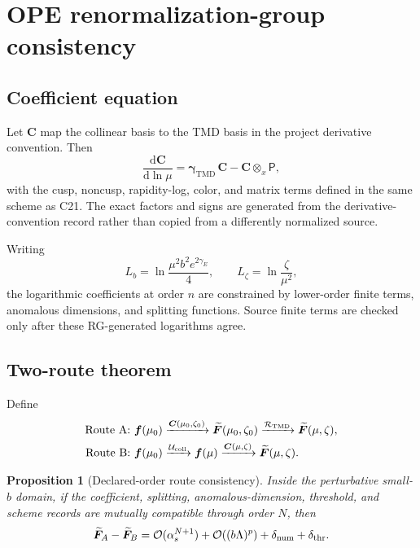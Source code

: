 \documentclass[11pt]{article}
\newtheorem{proposition}[definition]{Proposition}
\newcommand{\dd}{\mathrm{d}}
\newcommand{\TMD}{\mathrm{TMD}}
\newcommand{\cR}{\mathcal R}
\newcommand{\cU}{\mathcal U}
\newcommand{\otimesx}{\mathbin{\otimes_x}}
\newcommand{\order}{\mathcal O}
\newcommand{\as}{\alpha_s}
\begin{document}
\section{OPE renormalization-group consistency}
\label{sec:rg}

\subsection{Coefficient equation}

Let \(\bm C\) map the collinear basis to the TMD basis in the project derivative convention.  Then
\begin{equation}
 \frac{\dd\bm C}{\dd\ln\mu}
 =
 \bm\gamma_{\TMD}\,\bm C
 -\bm C\otimesx\bm{\mathsf P},
 \label{eq:coefficient-rge}
\end{equation}
with the cusp, noncusp, rapidity-log, color, and matrix terms defined in the same scheme as C21.  The exact factors and signs are generated from the derivative-convention record rather than copied from a differently normalized source.

Writing
\begin{equation}
 L_b=\ln\frac{\mu^2b^2e^{2\gamma_E}}{4},
 \qquad
 L_\zeta=\ln\frac{\zeta}{\mu^2},
 \label{eq:logs}
\end{equation}
the logarithmic coefficients at order \(n\) are constrained by lower-order finite terms, anomalous dimensions, and splitting functions.  Source finite terms are checked only after these RG-generated logarithms agree.

\subsection{Two-route theorem}

Define
\begin{align}
 \text{Route A: }&
 \bm f(\mu_0)
 \xrightarrow{\bm C(\mu_0,\zeta_0)}
 \widetilde{\bm F}(\mu_0,\zeta_0)
 \xrightarrow{\cR_{\TMD}}
 \widetilde{\bm F}(\mu,\zeta),
 \label{eq:route-a}\\
 \text{Route B: }&
 \bm f(\mu_0)
 \xrightarrow{\cU_{\rm coll}}
 \bm f(\mu)
 \xrightarrow{\bm C(\mu,\zeta)}
 \widetilde{\bm F}(\mu,\zeta).
 \label{eq:route-b}
\end{align}

\begin{proposition}[Declared-order route consistency]
Inside the perturbative small-\(b\) domain, if the coefficient, splitting, anomalous-dimension, threshold, and scheme records are mutually compatible through order \(N\), then
\begin{equation}
 \widetilde{\bm F}_{A}-\widetilde{\bm F}_{B}
 =
 \order(\as^{N+1})
 +\order((b\Lambda)^p)
 +\delta_{\rm num}
 +\delta_{\rm thr}.
 \label{eq:route-difference}
\end{equation}
\end{proposition}
\end{document}
